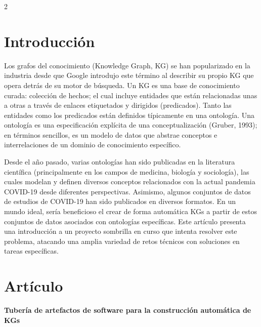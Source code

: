 \documentclass[12pt,spanish,Letterpaper,openany]{book}
\begin{document}
\begin {multicols}{2}

\hypertarget{introducciuxf3n-3}{%
\section{Introducción}\label{introducciuxf3n-3}}

Los grafos del conocimiento (Knowledge Graph, KG) se han popularizado en la industria desde que Google introdujo este término al describir su propio KG que opera detrás de su motor de búsqueda. Un KG es una base de conocimiento curada: colección de hechos; el cual incluye entidades que están relacionadas unas a otras a través de enlaces etiquetados y dirigidos (predicados). Tanto las entidades como los predicados están definidos típicamente en una ontología. Una ontología es una especificación explícita de una conceptualización (Gruber, 1993); en términos sencillos, es un modelo de datos que abstrae conceptos e interrelaciones de un dominio de conocimiento específico.

Desde el año pasado, varias ontologías han sido publicadas en la literatura científica (principalmente en los campos de medicina, biología y sociología), las cuales modelan y definen diversos conceptos relacionados con la actual pandemia COVID-19 desde diferentes perspectivas. Asimismo, algunos conjuntos de datos de estudios de COVID-19 han sido publicados en diversos formatos. En un mundo ideal, sería beneficioso el crear de forma automática KGs a partir de estos conjuntos de datos asociados con ontologías específicas. Este artículo presenta una introducción a un proyecto sombrilla en curso que intenta resolver este problema, atacando una amplia variedad de retos técnicos con soluciones en tareas específicas.

\hypertarget{artuxedculo-7}{%
\section{Artículo}\label{artuxedculo-7}}

\textbf{Tubería de artefactos de software para la construcción automática de KGs}


\end{multicols}
\end{document}
